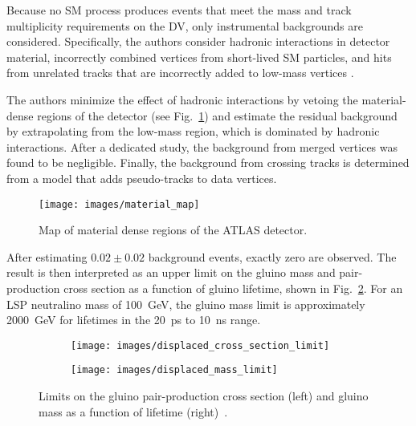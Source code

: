 \documentclass[12pt]{article}
\begin{document}
        Because no SM process produces events that meet the mass and track multiplicity requirements on the DV, only instrumental backgrounds are considered. Specifically, the authors consider hadronic interactions in detector material, incorrectly combined vertices from short-lived SM particles, and hits from unrelated tracks that are incorrectly added to low-mass vertices .

        The authors minimize the effect of hadronic interactions by vetoing the material-dense regions of the detector (see Fig.~\ref{material_map}) and estimate the residual background by extrapolating from the low-mass region, which is dominated by hadronic interactions. After a dedicated study, the background from merged vertices was found to be negligible. Finally, the background from crossing tracks is determined from a model that adds pseudo-tracks to data vertices.

        \noindent \begin{figure}[htbp] \begin{center}
        \texttt{[image: images/material\_map]}
            \caption{Map of material dense regions of the ATLAS detector.~\cite{atlas_displaced}}
        \label{material_map}
        \end{center} \end{figure}

        After estimating $\num{0.02} \pm \num{0.02}$ background events, exactly zero are observed. The result is then interpreted as an upper limit on the gluino mass and pair-production cross section as a function of gluino lifetime, shown in Fig.~\ref{displaced_limit}. For an LSP neutralino mass of \SI{100}{\giga\electronvolt}, the gluino mass limit is approximately \SI{2000}{\giga\electronvolt} for lifetimes in the \SI{20}{\pico\s} to \SI{10}{\nano\s} range.

        \noindent \begin{figure}[htbp] \begin{center}
        \begin{subfigure}[htbp]{0.45\textwidth} \begin{center}
        \texttt{[image: images/displaced\_cross\_section\_limit]}
        \end{center} \end{subfigure}
        \begin{subfigure}[htbp]{0.45\textwidth} \begin{center}
        \texttt{[image: images/displaced\_mass\_limit]}
        \end{center} \end{subfigure}
            \caption{Limits on the gluino pair-production cross section (left) and gluino mass as a function of lifetime (right)~\cite{atlas_displaced}.}
        \label{displaced_limit}
        \end{center} \end{figure}
\end{document}
